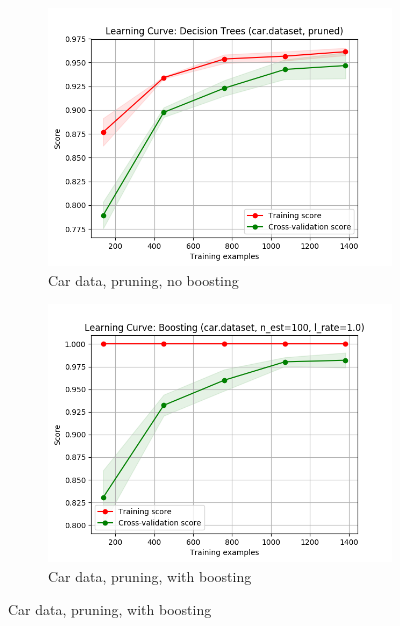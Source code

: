 \documentclass{article}
\begin{document}
    \begin{figure}[htb]
    \centering

    \begin{subfigure}{0.5\textwidth}
      \includegraphics[width=\linewidth]{out/decision_tree_pruning/car-prune-learning.png}
      \caption{Car data, pruning, no boosting}
      \label{fig:boosting-perf-1}
    \end{subfigure}\hfil
    \begin{subfigure}{0.5\textwidth}
      \includegraphics[width=\linewidth]{out/boosting/car-estimators-100.png}
      \caption{Car data, pruning, with boosting}
      \label{fig:boosting-perf-2}
    \end{subfigure}


\end{figure}
\end{document}
